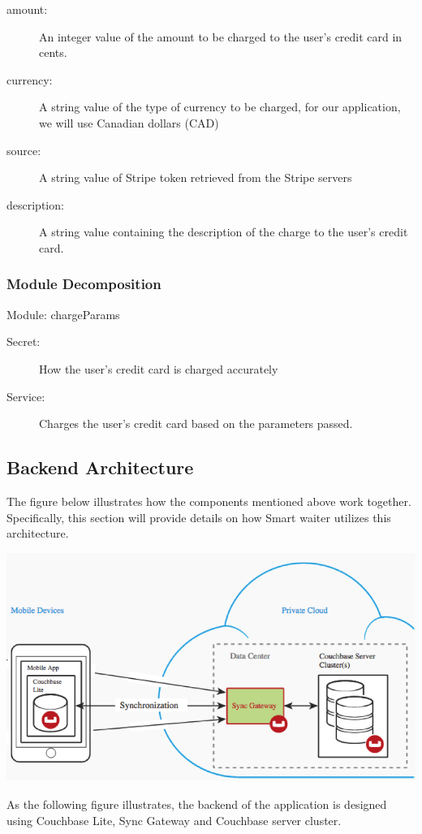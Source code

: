 \documentclass[12pt, titlepage]{article}
\begin{document}
\begin{description}
  \item[amount:] An integer value of the amount to be charged to the user's credit card in cents.
  \item[currency:] A string value of the type of currency to be charged, for our application, we will use Canadian dollars (CAD) 
  \item[source:] A string value of Stripe token retrieved from the Stripe servers 
  \item[description:] A string value containing the description of the charge to the user's credit card.
\end{description}

\subsubsection{Module Decomposition}
Module: chargeParams
\begin{description}
	\item[Secret:]How the user's credit card is charged accurately
	\item[Service:] Charges the user's credit card based on the parameters passed.
\end{description}

\subsection{Backend Architecture}

The figure below illustrates how the components mentioned above work together. Specifically, this section will provide details on how Smart waiter utilizes this architecture.

\includegraphics[width=150mm,scale=0.5]{couchbase.png}

As the following figure illustrates, the backend of the application is designed using Couchbase Lite, Sync Gateway and Couchbase server cluster.
\end{document}
